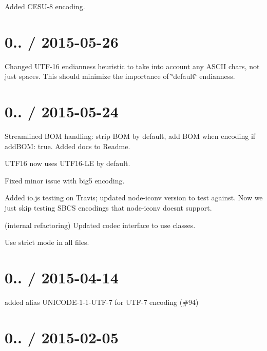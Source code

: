 \begin{DoxyItemize}
\item Added C\+E\+S\+U-\/8 encoding.
\end{DoxyItemize}

\section*{0.. / 2015-\/05-\/26}


\begin{DoxyItemize}
\item Changed U\+T\+F-\/16 endianness heuristic to take into account any A\+S\+C\+II chars, not just spaces. This should minimize the importance of \char`\"{}default\char`\"{} endianness.
\end{DoxyItemize}

\section*{0.. / 2015-\/05-\/24}


\begin{DoxyItemize}
\item Streamlined B\+OM handling\+: strip B\+OM by default, add B\+OM when encoding if add\+B\+OM\+: true. Added docs to Readme.
\item U\+T\+F16 now uses U\+T\+F16-\/\+LE by default.
\item Fixed minor issue with big5 encoding.
\item Added io.\+js testing on Travis; updated node-\/iconv version to test against. Now we just skip testing S\+B\+CS encodings that node-\/iconv doesn\textquotesingle{}t support.
\item (internal refactoring) Updated codec interface to use classes.
\item Use strict mode in all files.
\end{DoxyItemize}

\section*{0.. / 2015-\/04-\/14}


\begin{DoxyItemize}
\item added alias U\+N\+I\+C\+O\+D\+E-\/1-\/1-\/\+U\+T\+F-\/7 for U\+T\+F-\/7 encoding (\#94)
\end{DoxyItemize}

\section*{0.. / 2015-\/02-\/05}


